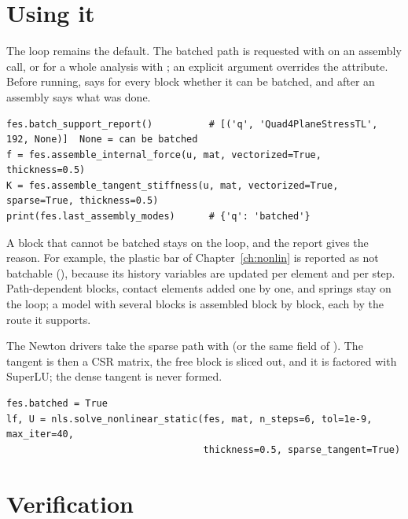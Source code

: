 \section{Using it}\label{sec:bk-use}

The loop remains the default. The batched path is requested with  on an assembly call, or for a whole analysis with ; an explicit argument overrides the attribute. Before running,  says for every block whether it can be batched, and after an assembly  says what was done.

\begin{lstlisting}[caption={Requesting batched assembly and checking what was used (plate of \cbkChunkedPlateElems{} \texttt{Quad4PlaneStressTL} elements).},label={lst:bk-use}]
fes.batch_support_report()          # [('q', 'Quad4PlaneStressTL', 192, None)]  None = can be batched
f = fes.assemble_internal_force(u, mat, vectorized=True, thickness=0.5)
K = fes.assemble_tangent_stiffness(u, mat, vectorized=True, sparse=True, thickness=0.5)
print(fes.last_assembly_modes)      # {'q': 'batched'}
\end{lstlisting}

A block that cannot be batched stays on the loop, and the report gives the reason. For example, the plastic bar of Chapter~\ref{ch:nonlin} is reported as not batchable (\emph{\cbkReasonPlastic}), because its history variables are updated per element and per step. Path-dependent blocks, contact elements added one by one, and springs stay on the loop; a model with several blocks is assembled block by block, each by the route it supports.

The Newton drivers take the sparse path with  (or the same field of ). The tangent is then a CSR matrix, the free block is sliced out, and it is factored with SuperLU; the dense tangent is never formed.

\begin{lstlisting}[caption={A load-controlled Newton solve with batched assembly and a sparse tangent.},label={lst:bk-newton}]
fes.batched = True
lf, U = nls.solve_nonlinear_static(fes, mat, n_steps=6, tol=1e-9, max_iter=40,
                                   thickness=0.5, sparse_tangent=True)
\end{lstlisting}

\section{Verification}\label{sec:bk-verif}

